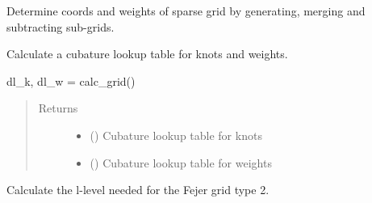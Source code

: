\documentclass[letterpaper,10pt,english,openany,oneside]{sphinxmanual}
\begin{document}
\begin{fulllineitems}
\begin{fulllineitems}
\begin{quote}
\begin{description}
\end{description}\end{quote}

\end{fulllineitems}


\begin{fulllineitems}
\label{\detokenize{pygpc:pygpc.Grid.SparseGrid.calc_coords_weights}}
Determine coords and weights of sparse grid by generating, merging and subtracting sub-grids.

\end{fulllineitems}


\begin{fulllineitems}
\label{\detokenize{pygpc:pygpc.Grid.SparseGrid.calc_grid}}
Calculate a cubature lookup table for knots and weights.

dl\_k, dl\_w = calc\_grid()
\begin{quote}\begin{description}
\item[{Returns}] \leavevmode
\begin{itemize}
\item {} 
 () \textendash{} Cubature lookup table for knots

\item {} 
 () \textendash{} Cubature lookup table for weights

\end{itemize}


\end{description}\end{quote}

\end{fulllineitems}


\begin{fulllineitems}
\label{\detokenize{pygpc:pygpc.Grid.SparseGrid.calc_l_level}}
Calculate the l-level needed for the Fejer grid type 2.


\end{fulllineitems}
\end{fulllineitems}
\end{document}
